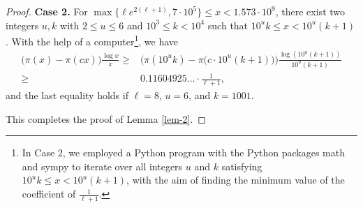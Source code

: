 \documentclass[10pt,a4paper]{amsart}
\begin{document}
\begin{proof}
 	\textbf{Case 2.} For $\max\{\ell e^{2(\ell+1)},7\cdot 10^{5}\}\leq x< 1.573\cdot 10^{9}$, there exist two integers $u,k$ with
 	$2\le u\le 6$ and  $10^3\le k<10^4$ such that $10^uk\le
 	x<10^u(k+1)$. With the help of a computer\footnote{In Case 2, we employed a Python program with the Python packages math and sympy to iterate over all integers $u$ and $k$ satisfying $10^{u}k\leq x<10^{u}(k+1)$, with the aim of finding the minimum value of the coefficient of $\frac{1}{\ell+1}$.}, we have
 	\begin{align*}
 		\big(\pi(x)-\pi(cx)\big)\frac{\log x}{x}
 		\geq &\Big( \pi(10^{u}k)-\pi \big(c \cdot 10^{u}(k+1) \big) \Big)\frac{\log \left( 10^{u}(k+1) \right)}{10^{u}(k+1)}\\
 		\geq &0.11604925\ldots \cdot \frac{1}{\ell+1},
 	\end{align*}
 	and the last equality holds if $\ell=8$, $u=6$, and $k=1001$.
 	
 	This completes the proof of Lemma \ref{lem-2}.
 \end{proof}
\end{document}
